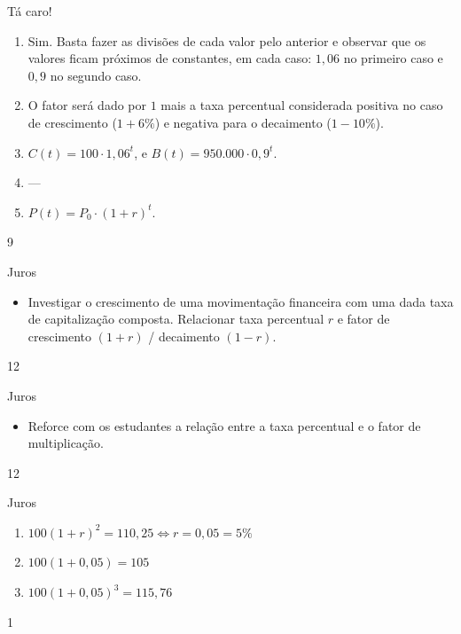 \begin{answer}{Tá caro!}
{\begin{enumerate}
	\item{}
	Sim. Basta fazer as divisões de cada valor pelo anterior e observar que os valores ficam próximos de constantes, em cada caso: $1,06$ no primeiro caso e $0,9$ no segundo caso.

	\item{}
	O fator será dado por $1$ mais a taxa percentual considerada positiva no caso de crescimento ($1+6\%$) e negativa para o decaimento ($1-10\%$).

	\item{}
	$C(t)=100\cdot1,06^{t}$, e $B(t)=950.000\cdot0,9^t$.

	\item{}
	---
	\item{}
	$P(t)=P_0\cdot(1+r)^t$.

	\end{enumerate}
}{9}
\end{answer}
\clearmargin
\begin{objectives}{Juros}
{
\begin{itemize}
\item Investigar o crescimento de uma movimentação financeira com uma dada taxa de capitalização composta. Relacionar taxa percentual $r$ e fator de crescimento $(1+r)$ / decaimento $(1 - r)$.
\end{itemize}
}{1}{2}
\end{objectives}
\begin{sugestions}{Juros}
{
\begin{itemize}
\item Reforce com os estudantes a relação entre a taxa percentual e o fator de multiplicação. 
\end{itemize}
}{1}{2}
\end{sugestions}
\begin{answer}{Juros}
{
\begin{enumerate}

\item{}
$100(1+r)^2 =110,25 \iff r=0,05 = 5\%$ 

\item{}
$100(1+0,05)=105$

\item{}
$100(1+0,05)^3=115,76$

\end{enumerate}
}{1}
\end{answer}



